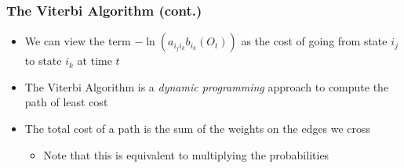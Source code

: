 \documentclass{beamer}
\begin{document}

\begin{frame} \frametitle{The Viterbi Algorithm (cont.)}

  \begin{itemize}
  \item We can view the term $-\ln(a_{i_ji_k}b_{i_k}(O_t))$ as the cost of going
    from state $i_j$ to state $i_k$ at time $t$
  \item The Viterbi Algorithm is a \emph{dynamic programming} approach to
    compute the path of least cost
  \item The total cost of a path is the sum of the weights on the edges we
    cross
    \begin{itemize}
    \item Note that this is equivalent to multiplying the probabilities
    \end{itemize}
  \end{itemize}
  
\end{frame}

\end{document}
